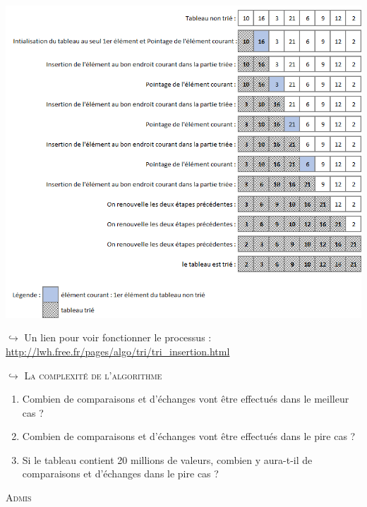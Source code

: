 \documentclass[a4paper,french]{article}
\begin{document}
\includegraphics[scale=0.5]{Triparinsertion.png}
\bigskip

$ \hookrightarrow$ Un lien pour voir fonctionner le processus : 
\url{http://lwh.free.fr/pages/algo/tri/tri_insertion.html}
\bigskip

$\hookrightarrow$ \textsc{La complexité de l'algorithme}

\begin{enumerate}
\item Combien de comparaisons et d'échanges vont être effectués dans le meilleur cas ?
\\
\item Combien de comparaisons et d'échanges vont être effectués dans le pire cas ?
\\
\item Si le tableau contient 20 millions de valeurs, combien y aura-t-il de comparaisons et d'échanges dans le pire cas ?
\end{enumerate}
\bigskip

\textsc{Admis}
\\
\end{document}
